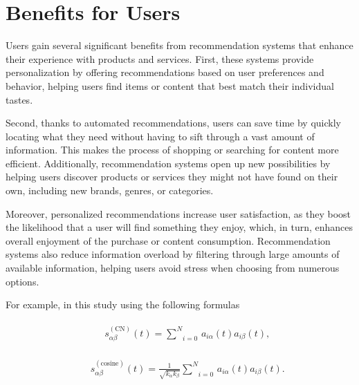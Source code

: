 \documentclass[10pt,twoside,slovak,a4paper]{article}
\begin{document}
\section{Benefits for Users} \label{Benefits for Users}
Users gain several significant benefits from recommendation systems that enhance their experience with products and services\cite{user}. First, these systems provide personalization by offering recommendations based on user preferences and behavior, helping users find items or content that best match their individual tastes.

Second, thanks to automated recommendations, users can save time by quickly locating what they need without having to sift through a vast amount of information. This makes the process of shopping or searching for content more efficient. Additionally, recommendation systems open up new possibilities by helping users discover products or services they might not have found on their own, including new brands, genres, or categories.


Moreover, personalized recommendations increase user satisfaction, as they boost the likelihood that a user will find something they enjoy, which, in turn, enhances overall enjoyment of the purchase or content consumption. Recommendation systems also reduce information overload by filtering through large amounts of available information, helping users avoid stress when choosing from numerous options.

For example, in this study \cite{closeness}using the following formulas

\begin{eqnarray}
    &&\begin{array}{*{35}{l}}
        s_{\alpha \beta}^{\left(\text{CN}\right)}(t)=\underset{i=0}{\overset{N}{\sum}}\,{{a}_{i\alpha}}(t){{a}_{i\beta}}(t), 
    \end{array}
\end{eqnarray}

\begin{eqnarray}
    &&\begin{array}{*{35}{l}}
        s_{\alpha \beta}^{\left(\text{cosine}\right)}(t)=\frac{1}{\sqrt{{{k}_{\alpha}}{{k}_{\beta}}}}\underset{i=0}{\overset{N}{\sum}}\,{{a}_{i\alpha}}(t){{a}_{i\beta}}(t). 
    \end{array}
\end{eqnarray}
\end{document}
